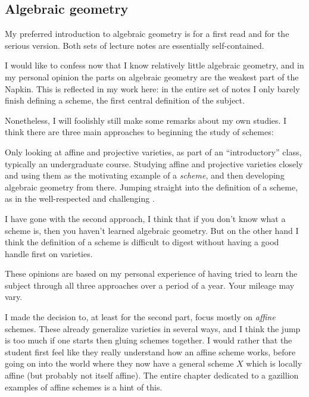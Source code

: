 \subsection{Algebraic geometry}
My preferred introduction to algebraic geometry is \cite{ref:gathmann}
for a first read and \cite{ref:vakil} for the serious version.
Both sets of lecture notes are essentially self-contained.

I would like to confess now that I know relatively little algebraic geometry,
and in my personal opinion the parts on algebraic geometry
are the weakest part of the Napkin.
This is reflected in my work here:
in the entire set of notes I only barely finish defining a scheme,
the first central definition of the subject.

Nonetheless, I will foolishly still make some remarks about my own studies.
I think there are three main approaches to beginning the study of schemes:
\begin{itemize}
	\ii Only looking at affine and projective varieties,
	as part of an ``introductory'' class,
	typically an undergraduate course.
	\ii Studying affine and projective varieties closely
	and using them as the motivating example of a \emph{scheme},
	and then developing algebraic geometry from there.
	\ii Jumping straight into the definition of a scheme,
	as in the well-respected and challenging \cite{ref:vakil}.
\end{itemize}
I have gone with the second approach,
I think that if you don't know what a scheme is,
then you haven't learned algebraic geometry.
But on the other hand I think the definition of a scheme is
difficult to digest without having a good handle first on varieties.

These opinions are based on my personal experience of having
tried to learn the subject through all
three approaches over a period of a year.
Your mileage may vary.

I made the decision to, at least for the second part,
focus mostly on \emph{affine} schemes.
These already generalize varieties in several ways,
and I think the jump is too much if one starts
then gluing schemes together.
I would rather that the student first feel like
they really understand how an affine scheme works,
before going on into the world where they now have a general scheme $X$
which is locally affine (but probably not itself affine).
The entire chapter dedicated to a gazillion examples
of affine schemes is a hint of this.

